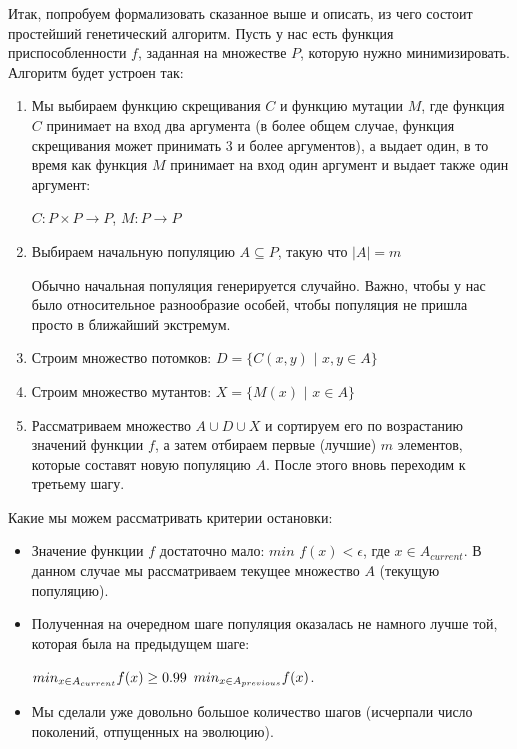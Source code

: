 \documentclass[a4paper,11pt,russian]{article}
\begin{document}
Итак, попробуем формализовать сказанное выше и описать, из чего состоит простейший генетический алгоритм. Пусть у нас есть функция приспособленности $f$, заданная на множестве $P$, которую нужно минимизировать. Алгоритм будет устроен так:
\begin{enumerate}
\item Мы выбираем функцию скрещивания $C$ и функцию мутации $M$, где функция $C$ принимает на вход два аргумента (в более общем случае, функция скрещивания может принимать 3 и более аргументов), а выдает один, в то время как функция $M$ принимает на вход один аргумент и выдает также один аргумент:

 $C: P \times P \rightarrow P$, $M: P \rightarrow P$
 
\item Выбираем начальную популяцию $A \subseteq P$, такую что $|A| = m$

 Обычно начальная популяция генерируется случайно. Важно, чтобы у нас было относительное разнообразие особей, чтобы популяция не пришла просто в ближайший экстремум.
 
\item Строим множество потомков: $D = \{ C(x,y)$ $| $ $x, y \in A \}$
\item Строим множество мутантов: $X = \{ M(x)$ $| $ $x \in A \}$
\item Рассматриваем множество $A \cup D \cup X$ и сортируем его по возрастанию значений функции $f$, а затем отбираем первые (лучшие) $m$ элементов, которые составят новую популяцию $A$. После этого вновь переходим к третьему шагу.
\end{enumerate}

Какие мы можем рассматривать критерии остановки:
\begin{itemize}
\item Значение функции $f$ достаточно мало: $min$ $f(x) < \epsilon$, где $x \in A_{current}$. В данном случае мы рассматриваем текущее множество $A$ (текущую популяцию).
\item Полученная на очередном шаге популяция оказалась не намного лучше той, которая была на предыдущем шаге:

 $\large{min_{x \in A_{current}} f(x) \geq 0.99 }$ $\large{min_{x \in A_{previous}} f(x)}$.
 
\item Мы сделали уже довольно большое количество шагов (исчерпали число поколений, отпущенных на эволюцию).
\end{itemize}
\end{document}
